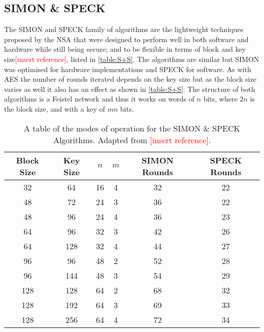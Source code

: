 \documentclass[12pt,twoside,a4paper]{report}
\begin{document}
    \subsection{SIMON \& SPECK}
    The SIMON and SPECK family of algorithms are the lightweight techniques proposed by the NSA that were designed to perform well in both software and hardware while still being secure; and to be flexible in terms of block and key size\textcolor{red}{[insert reference]}, listed in \autoref{table:S+S}.
    The algorithms are similar but SIMON was optimised for hardware implementations and SPECK for software.
    As with AES the number of rounds iterated depends on the key size but as the block size varies as well it also has an effect as shown in \autoref{table:S+S}.
    The structure of both algorithms is a Feistel network and thus it works on words of $n$ bits, where $2n$ is the block size, and with a key of $mn$ bits.
    
        \begin{table}[H]
        \centering
        \begin{tabular}{||c|c|c|c|c|c||}
            \hline \hline
            Block Size & Key Size & $n$ & $m$ & SIMON Rounds & SPECK Rounds \\
            \hline \hline
            32 & 64 & 16 & 4 & 32 & 22 \\
            \hline
            48 & 72 & 24 & 3 & 36 & 22 \\
            48 & 96 & 24 & 4 & 36 & 23 \\
            \hline
            64 & 96 & 32 & 3 & 42 & 26 \\
            64 & 128 & 32 & 4 & 44 & 27 \\
            \hline
            96 & 96 & 48 & 2 & 52 & 28 \\
            96 & 144 & 48 & 3 & 54 & 29 \\
            \hline
            128 & 128 & 64 & 2 & 68 & 32 \\
            128 & 192 & 64 & 3 & 69 & 33 \\
            128 & 256 & 64 & 4 & 72 & 34 \\
            \hline \hline
        \end{tabular}
        \caption{A table of the modes of operation for the SIMON \& SPECK Algorithms. Adapted from \textcolor{red}{[insert reference]}.}
        \label{table:S+S}
        \end{table}
    
\end{document}
